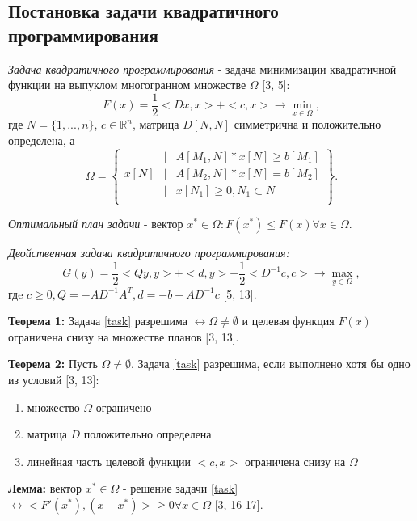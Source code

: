 
\subsection{Постановка задачи квадратичного программирования}
\textit{Задача квадратичного программирования} - задача минимизации квадратичной функции на выпуклом многогранном множестве $\Omega$ [3, 5]:
\begin{equation}
    F(x)=\frac{1}{2}<Dx,x>+<c,x>\rightarrow\min_{x\in\Omega},
    \label{task}
\end{equation}
где $N=\{1,...,n\}$, $c\in\mathbb{R}^n$, матрица $D[N,N]$ симметрична и положительно определена, а
\begin{equation}
    \Omega=
    \left\{
    \begin{matrix}
        & | & A[M_1,N]*x[N]\geq b[M_1]\\
        x[N] & | & A[M_2,N]*x[N]=b[M_2]\\
        & | & x[N_1]\geq0,N_1\subset N\\\
    \end{matrix}
    \right\}.
\end{equation}

\textit{Оптимальный план задачи} - вектор  $x^*\in\Omega:F(x^*)\leq F(x)\forall x\in\Omega$.

\textit{Двойственная задача квадратичного программирования:}
\begin{equation}
        G(y)=\frac{1}{2}<Qy,y>+<d,y>-\frac{1}{2}<D^{-1}c,c>\rightarrow\max_{y\in\Omega},
\end{equation}
гдe $c\geq0,Q=-AD^{-1}A^T,d=-b-AD^{-1}c$ [5, 13].

\textbf{Теорема 1:} Задача \eqref{task} разрешима $\leftrightarrow\Omega\not=\emptyset$ и целевая функция $F(x)$ ограничена снизу на множестве планов [3, 13].

\textbf{Теорема 2:} Пусть $\Omega\not=\emptyset$. Задача \eqref{task} разрешима, если выполнено хотя бы одно из условий [3, 13]:
\begin{enumerate}
    \item множество $\Omega$ ограничено
    \item матрица $D$ положительно определена
    \item линейная часть целевой функции $<c,x>$ ограничена снизу на $\Omega$
\end{enumerate}

\textbf{Лемма:} вектор $x^*\in\Omega$ - решение задачи \eqref{task} $\leftrightarrow<F'(x^*),(x-x^*)>\geq0\forall x\in\Omega$ [3, 16-17].

